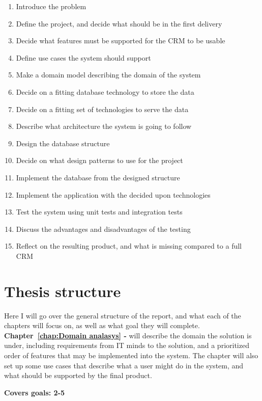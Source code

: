 \begin{enumerate}
  \item Introduce the problem
  \item Define the project, and decide what should be in the first delivery
  \item Decide what features must be supported for the CRM to be usable
  \item Define use cases the system should support
  \item Make a domain model describing the domain of the system
  \item Decide on a fitting database technology to store the data
  \item Decide on a fitting set of technologies to serve the data
  \item Describe what architecture the system is going to follow
  \item Design the database structure
  \item Decide on what design patterns to use for the project
  \item Implement the database from the designed structure
  \item Implement the application with the decided upon technologies
  \item Test the system using unit tests and integration tests
  \item Discuss the advantages and disadvantages of the testing
  \item Reflect on the resulting product, and what is missing compared to a full CRM
\end{enumerate}

\section{Thesis structure}
\label{sec:Thesis structure}
Here I will go over the general structure of the report, and what each of the chapters will focus on, as well as what goal they will complete.\\

\textbf{Chapter~\ref{chap:Domain analasys} - } will describe the domain the solution is under, including requirements from IT minds to the solution, and a prioritized order of features that may be implemented into the system. The chapter will also set up some use cases that describe what a user might do in the system, and what should be supported by the final product.

\textbf{Covers goals: 2-5}\\

